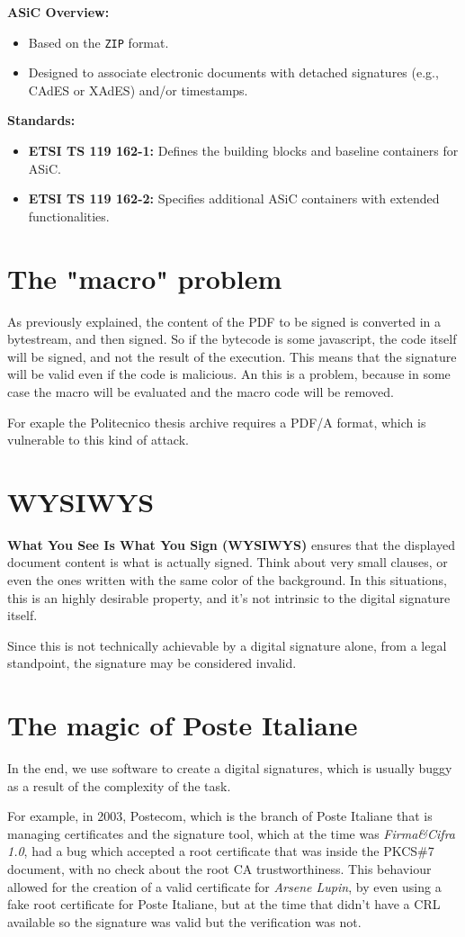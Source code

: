 \textbf{ASiC Overview:}
\begin{itemize}
    \item Based on the \texttt{ZIP} format.
    \item Designed to associate electronic documents with detached
      signatures (e.g., CAdES or XAdES) and/or timestamps.
\end{itemize}

\textbf{Standards:}
\begin{itemize}
    \item \textbf{ETSI TS 119 162-1:} Defines the building blocks and
      baseline containers for ASiC.
    \item \textbf{ETSI TS 119 162-2:} Specifies additional ASiC
      containers with extended functionalities.
\end{itemize}

\section{The "macro" problem}
As previously explained, the content of the PDF to be signed is
converted in a bytestream, and then signed. So if the bytecode is some
javascript, the code itself will be signed, and not the result of the
execution. This means that the signature will be valid even if the 
code is malicious. An this is a problem, because in some case the
macro will be evaluated and the macro code will be removed.

For exaple the Politecnico thesis archive requires a PDF/A format,
which is vulnerable to this kind of attack.

\section{WYSIWYS}
\textbf{What You See Is What You Sign (WYSIWYS)} ensures that the
displayed document content is what is actually signed. 
Think about very small clauses, or even the ones written with the same
color of the background. In this situations, this is an highly
desirable property, and it's not intrinsic to the digital signature 
itself.

Since this is not technically achievable by a digital signature alone,
from a legal standpoint, the signature may be considered invalid.

\section{The magic of Poste Italiane}
In the end, we use software to create a digital signatures, which is
usually buggy as a result of the complexity of the task. 

For example, in 2003, Postecom, which is the branch of Poste Italiane
that is managing certificates and the signature tool, which at the
time was \textit{Firma\&Cifra 1.0}, had a bug which accepted a root
certificate that was inside the PKCS\#7 document, with no check about
the root CA trustworthiness. This behaviour allowed for the creation
of a valid certificate for \textit{Arsene Lupin}, by even using a fake
root certificate for Poste Italiane, but at the time that
didn't have a CRL available so the signature was valid but the
verification was not.

